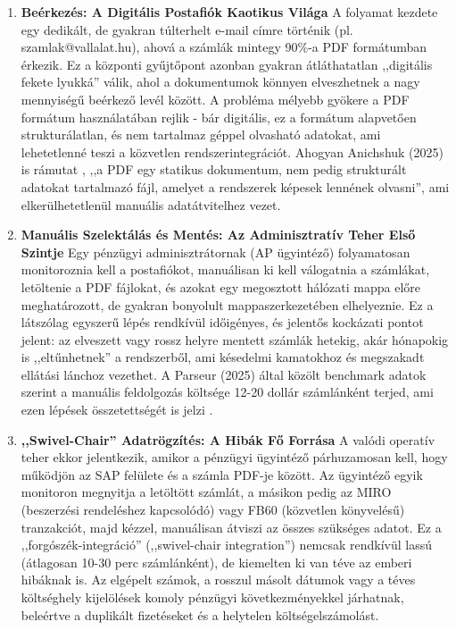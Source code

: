 \begin{enumerate}
    \item \textbf{Beérkezés: A Digitális Postafiók Kaotikus Világa} A folyamat kezdete egy dedikált, de gyakran túlterhelt e-mail címre történik (pl. szamlak@vallalat.hu), ahová a számlák mintegy 90\%-a PDF formátumban érkezik.
    Ez a központi gyűjtőpont azonban gyakran átláthatatlan ,,digitális fekete lyukká'' válik, ahol a dokumentumok könnyen elveszhetnek a nagy mennyiségű beérkező levél között.
    A probléma mélyebb gyökere a PDF formátum használatában rejlik - bár digitális, ez a formátum alapvetően strukturálatlan, és nem tartalmaz géppel olvasható adatokat, ami lehetetlenné teszi a közvetlen rendszerintegrációt.
    Ahogyan Anichshuk (2025) is rámutat \cite{Kolleno-PDFs-to-EInvoices}, ,,a PDF egy statikus dokumentum, nem pedig strukturált adatokat tartalmazó fájl, amelyet a rendszerek képesek lennének olvasni'', ami elkerülhetetlenül manuális adatátvitelhez vezet.
    \item \textbf{Manuális Szelektálás és Mentés: Az Adminisztratív Teher Első Szintje} Egy pénzügyi adminisztrátornak (AP ügyintéző) folyamatosan monitoroznia kell a postafiókot, manuálisan ki kell válogatnia a számlákat, letöltenie a PDF fájlokat, és azokat egy megosztott hálózati mappa előre meghatározott, de gyakran bonyolult mappaszerkezetében elhelyeznie.
    Ez a látszólag egyszerű lépés rendkívül időigényes, és jelentős kockázati pontot jelent: az elveszett vagy rossz helyre mentett számlák hetekig, akár hónapokig is ,,eltűnhetnek'' a rendszerből, ami késedelmi kamatokhoz és megszakadt ellátási lánchoz vezethet.
    A Parseur (2025) által közölt benchmark adatok szerint a manuális feldolgozás költsége 12-20 dollár számlánként terjed, ami ezen lépések összetettségét is jelzi \cite{Parseur-AI-Invoice-Processing}.
    \item \textbf{,,Swivel-Chair'' Adatrögzítés: A Hibák Fő Forrása} A valódi operatív teher ekkor jelentkezik, amikor a pénzügyi ügyintéző párhuzamosan kell, hogy működjön az SAP felülete és a számla PDF-je között.
    Az ügyintéző egyik monitoron megnyitja a letöltött számlát, a másikon pedig az MIRO (beszerzési rendeléshez kapcsolódó) vagy FB60 (közvetlen könyvelésű) tranzakciót, majd kézzel, manuálisan átviszi az összes szükséges adatot.
    Ez a ,,forgószék-integráció'' (,,swivel-chair integration'') nemcsak rendkívül lassú (átlagosan 10-30 perc számlánként), de kiemelten ki van téve az emberi hibáknak is.
    Az elgépelt számok, a rosszul másolt dátumok vagy a téves költséghely kijelölések komoly pénzügyi következményekkel járhatnak, beleértve a duplikált fizetéseket és a helytelen költségelszámolást.

\end{enumerate}
